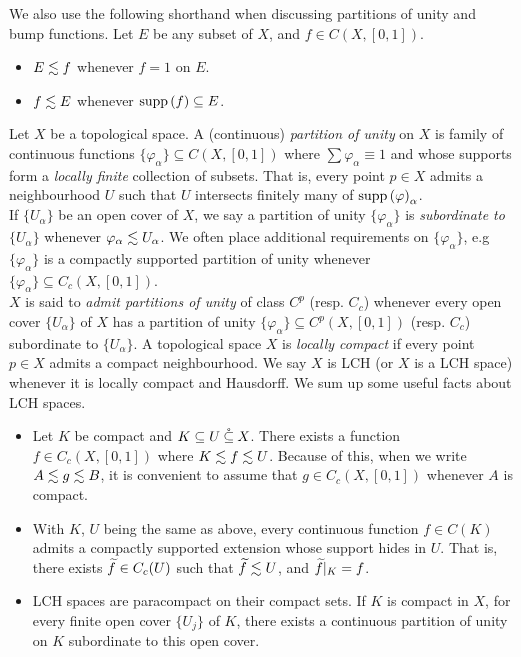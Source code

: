 \documentclass[../main-v2-manifolds.tex]{subfiles}
\begin{document}
We also use the following shorthand when discussing partitions of unity and bump functions. Let $E$ be any subset of $X$, and $f\in C(X,[0,1])$.
\begin{itemize}
    \item $E\lesssim f$ whenever $f=1$ on $E$.
    \item $f\lesssim E$ whenever $\operatorname{supp}{(f)}\subseteq E$.
\end{itemize}



Let $X$ be a topological space. A (continuous) \emph{partition of unity} on $X$ is family of continuous functions $\{\varphi_\alpha\}\subseteq C(X,[0,1])$ where $\sum \varphi_\alpha\equiv 1$ and whose supports form a \emph{locally finite} collection of subsets. That is, every point $p\in X$ admits a neighbourhood $U$ such that $U$ intersects finitely many of $\operatorname{supp}{(\varphi)}_\alpha$. \\

If $\{U_{\alpha}\}$ be an open cover of $X$, we say a partition of unity $\{\varphi_\alpha\}$ is  \emph{subordinate to $\{U_\alpha\}$} whenever $\varphi_\alpha\lesssim U_\alpha$. We often place additional requirements on $\{\varphi_\alpha\}$, e.g $\{\varphi_\alpha\}$ is a compactly supported partition of unity whenever $\{\varphi_\alpha\}\subseteq C_c(X,[0,1])$.\\

$X$ is said to \emph{admit partitions of unity} of class $C^p$ (resp. $C_c$) whenever every open cover $\{U_\alpha\}$ of $X$ has a partition of unity $\{\varphi_\alpha\}\subseteq C^p(X,[0,1])$ (resp. $C_c$) subordinate to $\{U_\alpha\}$.
A topological space $X$ is \emph{locally compact} if every point $p\in X$ admits a compact neighbourhood. We say $X$ is LCH (or $X$ is a LCH space) whenever it is locally compact and Hausdorff. We sum up some useful facts about LCH spaces.
\begin{itemize}
    \item Let $K$ be compact and $K\subseteq U\:\mathring{\subseteq}\: X$. There exists a function $f\in C_c(X,[0,1])$ where $K\lesssim f\lesssim U$. Because of this, when we write $A\lesssim g\lesssim B$, it is convenient to assume that $g\in C_c(X,[0,1])$ whenever $A$ is compact.
    \item With $K$, $U$ being the same as above, every continuous function $f\in C(K)$ admits a compactly supported extension whose support hides in $U$. That is, there exists $\widetilde{f}\in C_c(U)$ such that $\widetilde{f}\lesssim U$, and $\widetilde{f}\vert_K = f$.
    \item LCH spaces are paracompact on their compact sets. If $K$ is compact in $X$, for every finite open cover $\{U_{j}\}$ of $K$, there exists a continuous partition of unity on $K$ subordinate to this open cover.
\end{itemize}
\end{document}
